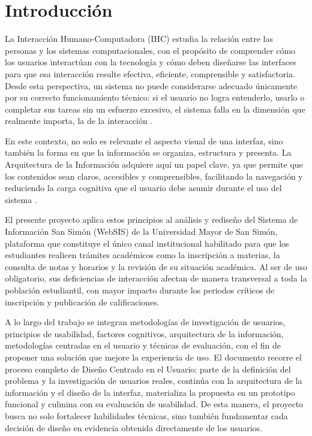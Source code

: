 \section{Introducción}

La Interacción Humano-Computadora (IHC) estudia la relación entre las personas y los sistemas computacionales, con el propósito de comprender cómo los usuarios interactúan con la tecnología y cómo deben diseñarse las interfaces para que esa interacción resulte efectiva, eficiente, comprensible y satisfactoria. Desde esta perspectiva, un sistema no puede considerarse adecuado únicamente por su correcto funcionamiento técnico: si el usuario no logra entenderlo, usarlo o completar sus tareas sin un esfuerzo excesivo, el sistema falla en la dimensión que realmente importa, la de la interacción \autocite{nielsen1994,norman2002}.

En este contexto, no solo es relevante el aspecto visual de una interfaz, sino también la forma en que la información se organiza, estructura y presenta. La Arquitectura de la Información adquiere aquí un papel clave, ya que permite que los contenidos sean claros, accesibles y comprensibles, facilitando la navegación y reduciendo la carga cognitiva que el usuario debe asumir durante el uso del sistema \autocite{rosenfeld2015}.

El presente proyecto aplica estos principios al análisis y rediseño del Sistema de Información San Simón (WebSIS) de la Universidad Mayor de San Simón, plataforma que constituye el único canal institucional habilitado para que los estudiantes realicen trámites académicos como la inscripción a materias, la consulta de notas y horarios y la revisión de su situación académica. Al ser de uso obligatorio, sus deficiencias de interacción afectan de manera transversal a toda la población estudiantil, con mayor impacto durante los periodos críticos de inscripción y publicación de calificaciones.

A lo largo del trabajo se integran metodologías de investigación de usuarios, principios de usabilidad, factores cognitivos, arquitectura de la información, metodologías centradas en el usuario y técnicas de evaluación, con el fin de proponer una solución que mejore la experiencia de uso. El documento recorre el proceso completo de Diseño Centrado en el Usuario: parte de la definición del problema y la investigación de usuarios reales, continúa con la arquitectura de la información y el diseño de la interfaz, materializa la propuesta en un prototipo funcional y culmina con su evaluación de usabilidad. De esta manera, el proyecto busca no solo fortalecer habilidades técnicas, sino también fundamentar cada decisión de diseño en evidencia obtenida directamente de los usuarios.
